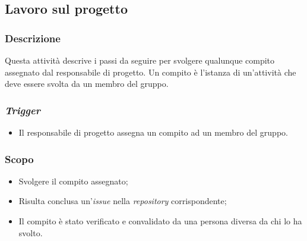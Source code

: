 \subsection{Lavoro sul progetto}
\label{lavoro-sul-progetto}

\subsubsection{Descrizione}
Questa attività descrive i passi da seguire per svolgere qualunque compito
assegnato dal responsabile di progetto. Un compito è l'istanza di un'attività
che deve essere svolta da un membro del gruppo.


\subsubsection{\textit{Trigger}}
\begin{itemize}
	\item Il responsabile di progetto assegna un compito ad un membro del
	      gruppo.
\end{itemize}

\subsubsection{Scopo}
\begin{itemize}
	\item Svolgere il compito assegnato;
	\item Risulta conclusa un'\textit{issue} nella \textit{repository}
	      corrispondente;
	\item Il compito è stato verificato e convalidato da una persona diversa
	      da chi lo ha svolto.
\end{itemize}


